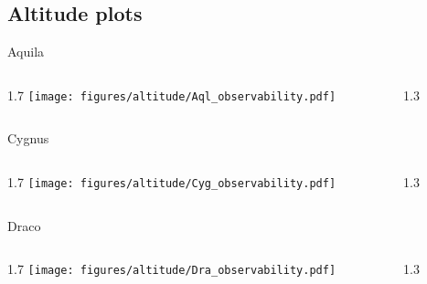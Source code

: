 \documentclass[final]{beamer}
\newlength{\colwidth}
\begin{document}
\subsection{Altitude plots}

\begin{frame}[t]{}
  \Large{Aquila}
  \begin{columns}[T]
    \begin{column}{1.7\colwidth}
      \centering
      \texttt{[image: figures/altitude/Aql\_observability.pdf]}
    \end{column}
    \begin{column}{1.3\colwidth}
      \Large
      
    \end{column}
  \end{columns}

  \Large{Cygnus}
  \begin{columns}[T]
    \begin{column}{1.7\colwidth}
      \centering
      \texttt{[image: figures/altitude/Cyg\_observability.pdf]}
    \end{column}
    \begin{column}{1.3\colwidth}
      \Large
      
    \end{column}
  \end{columns}

  \Large{Draco}
  \begin{columns}[T]
    \begin{column}{1.7\colwidth}
      \centering
      \texttt{[image: figures/altitude/Dra\_observability.pdf]}
    \end{column}
    \begin{column}{1.3\colwidth}
      \Large
      
    \end{column}
  \end{columns}
\end{frame}

\end{document}
